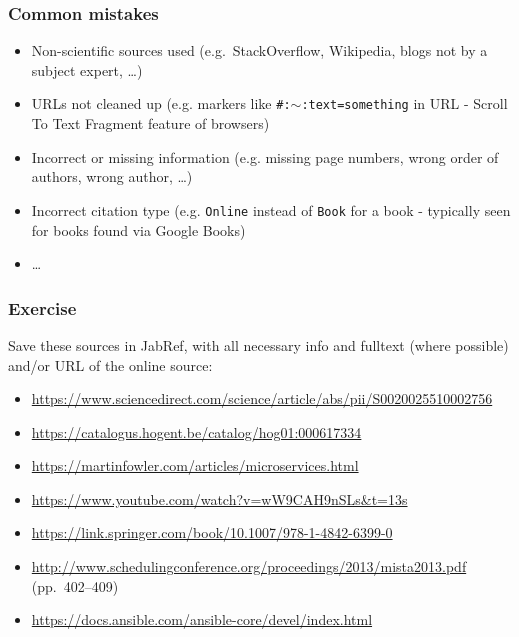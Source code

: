 \documentclass[aspectratio=169]{beamer}
\begin{document}
\begin{frame}
  \frametitle{Common mistakes}

  \begin{itemize}
    \item Non-scientific sources used (e.g.\ StackOverflow, Wikipedia, blogs not by a subject expert, \ldots)
    \item URLs not cleaned up (e.g. markers like \texttt{\#:$\sim$:text=something} in URL - Scroll To Text Fragment feature of browsers)
    \item Incorrect or missing information (e.g. missing page numbers, wrong order of authors, wrong author, \ldots)
    \item Incorrect citation type (e.g. \texttt{Online} instead of \texttt{Book} for a book - typically seen for books found via Google Books)
    \item \ldots
  \end{itemize}
\end{frame}

\begin{frame}[plain]
    \frametitle{Exercise}
    
    Save these sources in JabRef, with all necessary info and fulltext (where possible) and/or URL of the online source:
    
    \bigskip
    
    \begin{itemize}
        \item \url{https://www.sciencedirect.com/science/article/abs/pii/S0020025510002756}
        \item \url{https://catalogus.hogent.be/catalog/hog01:000617334}
        \item \url{https://martinfowler.com/articles/microservices.html}
        \item \url{https://www.youtube.com/watch?v=wW9CAH9nSLs&t=13s}
        \item \url{https://link.springer.com/book/10.1007/978-1-4842-6399-0}
        \item \url{http://www.schedulingconference.org/proceedings/2013/mista2013.pdf} (pp.\ 402--409)
        \item \url{https://docs.ansible.com/ansible-core/devel/index.html}
    \end{itemize}
    
\end{frame}
\end{document}
